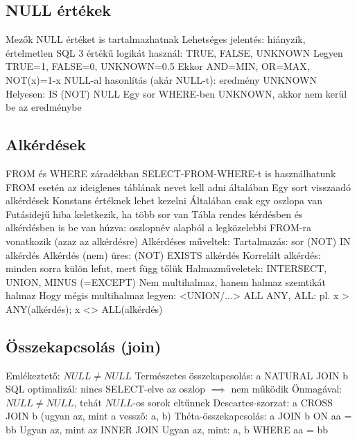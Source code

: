 \documentclass[12pt,a4paper]{article}
\begin{document}
\pagebreak

\subsection{NULL értékek}

\begin{outline}
	\1 Mezők NULL értéket is tartalmazhatnak
	\1 Lehetséges jelentés: hiányzik, értelmetlen
	\1 SQL 3 értékű logikát használ: TRUE, FALSE, UNKNOWN
		\2 Legyen TRUE=1, FALSE=0, UNKNOWN=0.5
		\2 Ekkor AND=MIN, OR=MAX, NOT(x)=1-x
	\1 NULL-al hasonlítás (akár NULL-t): eredmény UNKNOWN
		\2 Helyesen: IS (NOT) NULL
	\1 Egy sor WHERE-ben UNKNOWN, akkor nem kerül be az eredménybe
\end{outline}

\subsection{Alkérdések}

\begin{outline}
	\1 FROM és WHERE záradékban SELECT-FROM-WHERE-t is használhatunk
		\2 FROM esetén az ideiglenes táblának nevet kell adni általában
	\1 Egy sort visszaadó alkérdések
		\2 Konstans értéknek lehet kezelni
		\2 Általában csak egy oszlopa van
		\2 Futásidejű hiba keletkezik, ha több sor van
	\1 Tábla rendes kérdésben és alkérdésben is be van húzva: oszlopnév alapból a legközelebbi FROM-ra vonatkozik (azaz az alkérdésre)
	\1 Alkérdéses műveltek:
		\2 Tartalmazás: sor (NOT) IN alkérdés
		\2 Alkérdés (nem) üres: (NOT) EXISTS alkérdés
			\3 Korrelált alkérdés: minden sorra külön lefut, mert függ tőlük
		\2 Halmazműveletek: INTERSECT, UNION, MINUS (=EXCEPT)
			\3 Nem multihalmaz, hanem halmaz szemtikát halmaz
			\3 Hogy mégis multihalmaz legyen: <UNION/...> ALL
		\2 ANY, ALL: pl. x > ANY(alkérdés); x <> ALL(alkérdés)
\end{outline}

\pagebreak

\subsection{Összekapcsolás (join)}

\begin{outline}
	\1 Emlékeztető: $NULL \ne NULL$
	\1 Természetes összekapcsolás: a NATURAL JOIN b
		\2 SQL optimalizál: nincs SELECT-elve az oszlop $\implies$ nem működik
		\2 Önmagával: $NULL \ne NULL$, tehát $NULL$-os sorok eltűnnek
	\1 Descartes-szorzat: a CROSS JOIN b (ugyan az, mint a vessző: a, b)
	\1 Théta-összekapcsolás: a JOIN b ON aa = bb
		\2 Ugyan az, mint az INNER JOIN
		\2 Ugyan az, mint: a, b WHERE aa = bb
\end{outline}
\end{document}
